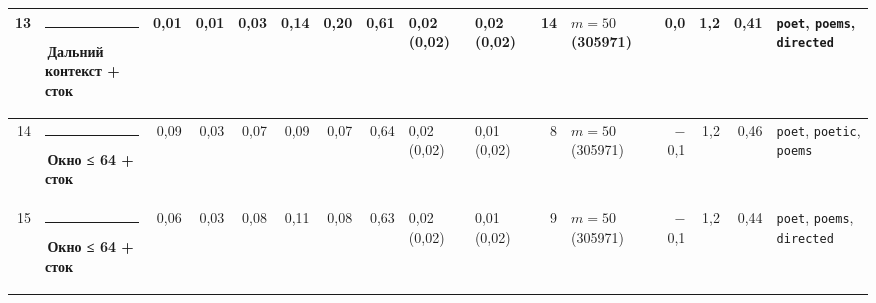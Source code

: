 \documentclass[10pt]{article}
\begin{document}
\begin{minipage}{\linewidth}
\begin{center}
{\begin{tabular}{|r|l|r|r|r|r|r|r|l|l|r|l|r|r|r|l|}
13 & \textcolor[HTML]{C3C2B7}{\rule{0.62em}{0.62em}}\,Дальний контекст + сток & 0,01 & 0,01 & 0,03 & 0,14 & 0,20 & 0,61 & 0,02 (0,02) & 0,02 (0,02) & 14 & $m{=}50$ (305971) & 0,0 & 1,2 & 0,41 & \texttt{\textvisiblespace{}poet}, \texttt{\textvisiblespace{}poems}, \texttt{\textvisiblespace{}directed} \\ \hline
14 & \textcolor[HTML]{EDA100}{\rule{0.62em}{0.62em}}\,\textbf{Окно ≤ 64 + сток} & 0,09 & 0,03 & 0,07 & 0,09 & 0,07 & 0,64 & 0,02 (0,02) & 0,01 (0,02) & 8 & $m{=}50$ (305971) & $-$0,1 & 1,2 & 0,46 & \texttt{\textvisiblespace{}poet}, \texttt{\textvisiblespace{}poetic}, \texttt{\textvisiblespace{}poems} \\ \hline
15 & \textcolor[HTML]{EDA100}{\rule{0.62em}{0.62em}}\,\textbf{Окно ≤ 64 + сток} & 0,06 & 0,03 & 0,08 & 0,11 & 0,08 & 0,63 & 0,02 (0,02) & 0,01 (0,02) & 9 & $m{=}50$ (305971) & $-$0,1 & 1,2 & 0,44 & \texttt{\textvisiblespace{}poet}, \texttt{\textvisiblespace{}poems}, \texttt{\textvisiblespace{}directed} \\ \hline
\hline\end{tabular}}\end{center}
\end{minipage}
\par\vspace{0.4em}
\end{document}
